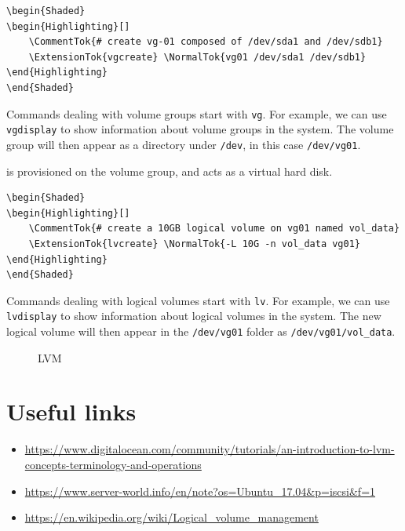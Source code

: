\begin{description}
\begin{verbatim}
\begin{Shaded}
\begin{Highlighting}[]
    \CommentTok{# create vg-01 composed of /dev/sda1 and /dev/sdb1}
    \ExtensionTok{vgcreate} \NormalTok{vg01 /dev/sda1 /dev/sdb1}
\end{Highlighting}
\end{Shaded}
\end{verbatim}

Commands dealing with volume groups start with \texttt{vg}. For example,
we can use \texttt{vgdisplay} to show information about volume groups in
the system. The volume group will then appear as a directory under
\texttt{/dev}, in this case \texttt{/dev/vg01}.
\item[Logical volume]
is provisioned on the volume group, and acts as a virtual hard disk.

\begin{verbatim}
\begin{Shaded}
\begin{Highlighting}[]
    \CommentTok{# create a 10GB logical volume on vg01 named vol_data}
    \ExtensionTok{lvcreate} \NormalTok{-L 10G -n vol_data vg01}
\end{Highlighting}
\end{Shaded}
\end{verbatim}

Commands dealing with logical volumes start with \texttt{lv}. For
example, we can use \texttt{lvdisplay} to show information about logical
volumes in the system. The new logical volume will then appear in the
\texttt{/dev/vg01} folder as \texttt{/dev/vg01/vol\_data}.
\end{description}

\begin{figure}
\centering
\caption{LVM}
\end{figure}

\section{Useful links}\label{useful-links}

\begin{itemize}
\item
  \url{https://www.digitalocean.com/community/tutorials/an-introduction-to-lvm-concepts-terminology-and-operations}
\item
  \url{https://www.server-world.info/en/note?os=Ubuntu_17.04\&p=iscsi\&f=1}
\item
  \url{https://en.wikipedia.org/wiki/Logical_volume_management}
\end{itemize}
